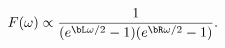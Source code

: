 \begin{equation} \label{stringy-spectrum}
F(\omega) \propto \frac{1}{(e^{\bL \omega/2} - 1)(e^{\bR \omega/2} - 1)}.
\end{equation}


